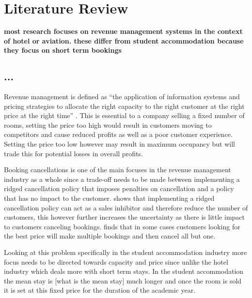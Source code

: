 \chapter{Literature Review}
\label{ch:lit_rev}

\textbf{most research focuses on revenue management systems in the context of hotel or aviation. these differ from student accommodation because they focus on short term bookings}

\section{...}
Revenue management is defined as “the application of information systems and pricing strategies to allocate the right capacity to the right customer at the right price at the right time” \cite{Kimes2003HasAcceptable}. This is essential to a company selling a fixed number of rooms, setting the price too high would result in customers moving to competitors and cause reduced profits as well as a poor customer experience. Setting the price too low however may result in maximum occupancy but will trade this for potential losses in overall profits.

\vspace{5mm}

Booking cancellations is one of the main focuses in the revenue management industry as a whole \cite{Subramanian1999AirlineNo-shows} since a trade-off needs to be made between implementing a ridged cancellation policy that imposes penalties on cancellation and a policy that has no impact to the customer. \cite{Jinhong2007ServiceCancellations} shows that implementing a ridged cancellation policy can act as a sales inhibitor and therefore reduce the number of customers, this however further increases the uncertainty as there is little impact to customers canceling bookings. \cite{Talluri2004TheManagement} finds that in some cases customers looking for the best price will make multiple bookings and then cancel all but one. 

\vspace{5mm}

Looking at this problem specifically in the student accommodation industry more focus needs to be directed towards capacity and price since unlike the hotel industry which deals more with short term stays. In the student accommodation the mean stay is [what is the mean stay] much longer and once the room is sold it is set at this fixed price for the duration of the academic year.
 \vspace{5mm}
 
